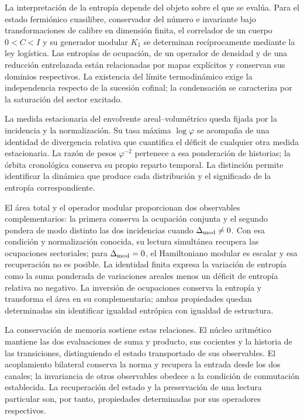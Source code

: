 La interpretación de la entropía depende del objeto sobre el que se
evalúa. Para el estado fermiónico cuasilibre, conservador del número
e invariante bajo transformaciones de calibre en dimensión finita,
el correlador de un cuerpo \(0<C<I\) y su generador modular \(K_1\)
se determinan recíprocamente mediante la ley logística.
Las entropías de ocupación, de un operador de densidad y de una
reducción entrelazada están relacionadas por mapas explícitos y
conservan sus dominios respectivos. La existencia del límite
termodinámico exige la independencia respecto de la sucesión cofinal;
la condensación se caracteriza por la saturación del sector excitado.

La medida estacionaria del envolvente areal--volumétrico queda fijada
por la incidencia y la normalización. Su tasa máxima \(\log\varphi\)
se acompaña de una identidad de divergencia relativa que cuantifica el
déficit de cualquier otra medida estacionaria. La razón de pesos
\(\varphi^{-2}\) pertenece a esa ponderación de historias; la órbita
cronológica conserva su propio reparto temporal. La distinción permite
identificar la dinámica que produce cada distribución y el significado
de la entropía correspondiente.

El área total y el operador modular proporcionan dos observables
complementarios: la primera conserva la ocupación conjunta y el segundo
pondera de modo distinto las dos incidencias cuando \(\Delta_{\rm mod}\ne0\).
Con esa condición y normalización conocida, su lectura simultánea
recupera las ocupaciones sectoriales; para \(\Delta_{\rm mod}=0\),
el Hamiltoniano modular es escalar y esa recuperación no es posible.
La identidad finita expresa la variación de entropía como la suma
ponderada de variaciones areales menos un déficit de entropía relativa
no negativo. La inversión de ocupaciones
conserva la entropía y transforma el área en su complementaria; ambas
propiedades quedan determinadas sin identificar igualdad entrópica
con igualdad de estructura.

La conservación de memoria sostiene estas relaciones. El núcleo
aritmético mantiene las dos evaluaciones de suma y producto, sus
cocientes y la historia de las transiciones, distinguiendo el estado
transportado de sus observables. El acoplamiento bilateral conserva
la norma y recupera la entrada desde los dos canales; la invariancia
de otros observables obedece a la condición de conmutación establecida.
La recuperación del estado y la preservación de una lectura particular
son, por tanto, propiedades determinadas por sus operadores respectivos.

